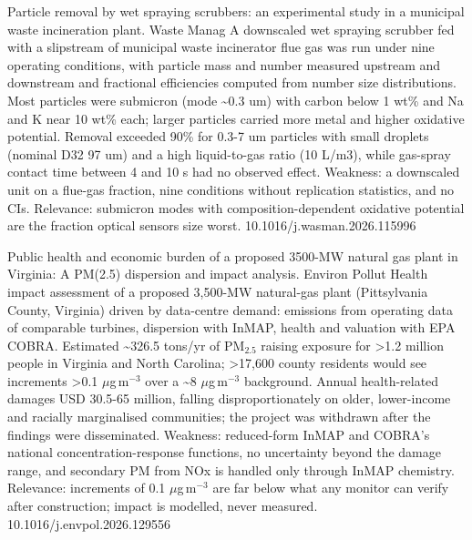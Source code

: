 \documentclass[10pt]{article}
\begin{document}
{Particle removal by wet spraying scrubbers: an experimental study in a municipal waste incineration plant.}
{Waste Manag}
{A downscaled wet spraying scrubber fed with a slipstream of municipal waste incinerator flue gas was run under nine operating conditions, with particle mass and number measured upstream and downstream and fractional efficiencies computed from number size distributions. Most particles were submicron (mode \textasciitilde{}0.3 um) with carbon below 1 wt\% and Na and K near 10 wt\% each; larger particles carried more metal and higher oxidative potential. Removal exceeded 90\% for 0.3-7 um particles with small droplets (nominal D32 97 um) and a high liquid-to-gas ratio (10 L/m3), while gas-spray contact time between 4 and 10 s had no observed effect. Weakness: a downscaled unit on a flue-gas fraction, nine conditions without replication statistics, and no CIs. Relevance: submicron modes with composition-dependent oxidative potential are the fraction optical sensors size worst.}
{10.1016/j.wasman.2026.115996}

\par{}\baselineskip{}\baselineskip
{}

{Public health and economic burden of a proposed 3500-MW natural gas plant in Virginia: A PM(2.5) dispersion and impact analysis.}
{Environ Pollut}
{Health impact assessment of a proposed 3,500-MW natural-gas plant (Pittsylvania County, Virginia) driven by data-centre demand: emissions from operating data of comparable turbines, dispersion with InMAP, health and valuation with EPA COBRA. Estimated \textasciitilde{}326.5 tons/yr of PM$_{2.5}$ raising exposure for >1.2 million people in Virginia and North Carolina; >17,600 county residents would see increments >0.1 $\mu$g\,m$^{-3}$ over a \textasciitilde{}8 $\mu$g\,m$^{-3}$ background. Annual health-related damages USD 30.5-65 million, falling disproportionately on older, lower-income and racially marginalised communities; the project was withdrawn after the findings were disseminated. Weakness: reduced-form InMAP and COBRA's national concentration-response functions, no uncertainty beyond the damage range, and secondary PM from NOx is handled only through InMAP chemistry. Relevance: increments of 0.1 $\mu$g\,m$^{-3}$ are far below what any monitor can verify after construction; impact is modelled, never measured.}
{10.1016/j.envpol.2026.129556}
\end{document}
